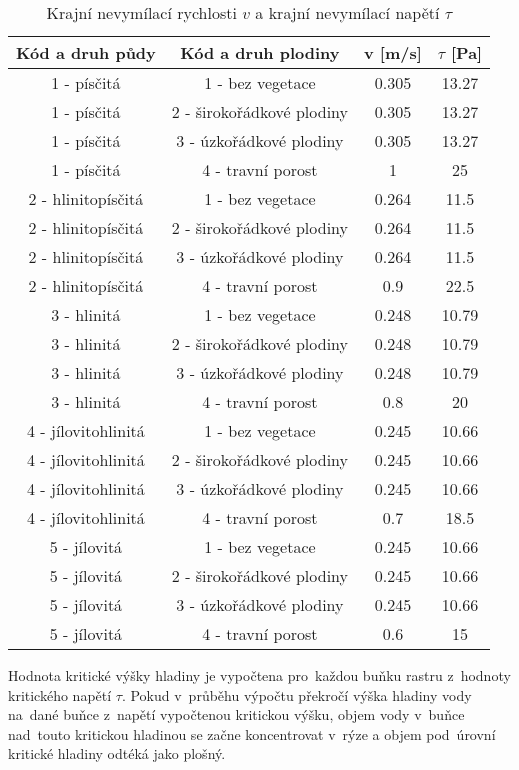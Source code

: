 \begin{center}
\begin{table}[ht]
  \begin{center}
    \begin{tabular}{|c|c|c|c|} \hline
      \bf{Kód a druh půdy} & \bf{Kód a druh plodiny} & \bf{v [m/s]} & \bf{$\tau$ [Pa]} \\ \hline \hline
1 - písčitá & 1 - bez vegetace & 0.305 & 13.27  \\ \hline
1 - písčitá & 2 - širokořádkové plodiny & 0.305 & 13.27 \\ \hline
1 - písčitá & 3 - úzkořádkové plodiny & 0.305 & 13.27  \\ \hline
1 - písčitá & 4 - travní porost & 1 & 25 \\ \hline \hline
2 - hlinitopísčitá & 1 - bez vegetace & 0.264 & 11.5  \\ \hline
2 - hlinitopísčitá & 2 - širokořádkové plodiny & 0.264 & 11.5 \\ \hline
2 - hlinitopísčitá & 3 - úzkořádkové plodiny & 0.264 & 11.5  \\ \hline
2 - hlinitopísčitá & 4 - travní porost & 0.9 & 22.5 \\ \hline \hline
3 - hlinitá & 1 - bez vegetace & 0.248 & 10.79  \\ \hline
3 - hlinitá & 2 - širokořádkové plodiny & 0.248 & 10.79 \\ \hline
3 - hlinitá & 3 - úzkořádkové plodiny & 0.248 & 10.79  \\ \hline
3 - hlinitá & 4 - travní porost & 0.8 & 20 \\ \hline \hline
4 - jílovitohlinitá & 1 - bez vegetace & 0.245 & 10.66  \\ \hline
4 - jílovitohlinitá & 2 - širokořádkové plodiny & 0.245 & 10.66 \\ \hline
4 - jílovitohlinitá & 3 - úzkořádkové plodiny & 0.245 & 10.66  \\ \hline
4 - jílovitohlinitá & 4 - travní porost & 0.7 & 18.5 \\ \hline \hline
5 - jílovitá & 1 - bez vegetace & 0.245 & 10.66  \\ \hline
5 - jílovitá & 2 - širokořádkové plodiny & 0.245 & 10.66 \\ \hline
5 - jílovitá & 3 - úzkořádkové plodiny & 0.245 & 10.66  \\ \hline
5 - jílovitá & 4 - travní porost & 0.6 & 15 \\ \hline 
    \end{tabular}
  \end{center}
  \vskip3mm  %
  \caption{Krajní nevymílací rychlosti $v$ a krajní nevymílací napětí $\tau$ \cite{vrana}}
  \label{Tab. kritickehodnoty}
\end{table}
\end{center}
Hodnota kritické výšky hladiny je vypočtena pro~každou buňku rastru z~hodnoty kritického napětí $\tau$. Pokud v~průběhu výpočtu překročí výška hladiny vody na~dané buňce z~napětí vypočtenou kritickou výšku,
objem vody v~buňce nad~touto kritickou hladinou se začne koncentrovat v~rýze a objem pod~úrovní kritické hladiny odtéká jako plošný.
